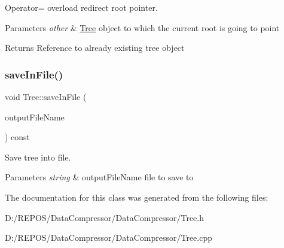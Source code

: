 Operator= overload redirect root pointer. 


\begin{DoxyParams}{Parameters}
{\em other} & \mbox{\hyperlink{class_tree}{Tree}} object to which the current root is going to point \\
\hline
\end{DoxyParams}
\begin{DoxyReturn}{Returns}
Reference to already existing tree object 
\end{DoxyReturn}
\mbox{\label{class_tree_aa62007059bd76aa204028499f4ad264c}} 
\subsubsection{\texorpdfstring{saveInFile()}{saveInFile()}}
{\footnotesize\ttfamily void Tree\+::save\+In\+File (\begin{DoxyParamCaption}\item[{string}]{output\+File\+Name }\end{DoxyParamCaption}) const}



Save tree into file. 


\begin{DoxyParams}{Parameters}
{\em string} & output\+File\+Name file to save to \\
\hline
\end{DoxyParams}


The documentation for this class was generated from the following files\+:\begin{DoxyCompactItemize}
\item 
D\+:/\+R\+E\+P\+O\+S/\+Data\+Compressor/\+Data\+Compressor/Tree.\+h\item 
D\+:/\+R\+E\+P\+O\+S/\+Data\+Compressor/\+Data\+Compressor/Tree.\+cpp\end{DoxyCompactItemize}
